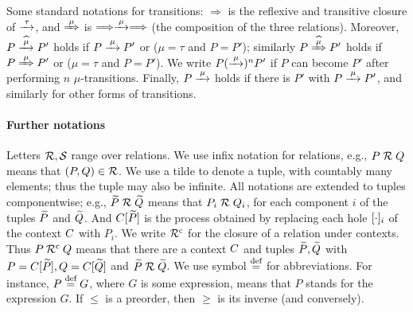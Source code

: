 Some standard notations for transitions:  $\Longrightarrow $ is the 
reflexive and  transitive closure of $\arr\tau $, and 
$\Arr \mu $ is $\Longrightarrow \arr\mu \Longrightarrow $ (the
composition of the three relations).
Moreover,   
$ 
P \arcap \mu P'$ holds if $P \arr\mu P'$ or ($\mu =\tau$ and
$P=P'$); similarly 
$ 
P \Arcap \mu P'$ holds if $P \Arr\mu P'$ or ($\mu =\tau$ and
$P=P'$).
We write $P (\arr\mu)^n P'$ if $P$ can become $P'$ after performing
$n$ $\mu$-transitions. Finally, $P \arr\mu$ holds if there is $P'$
with $P \arr\mu P'$, and similarly for other forms of transitions.




\paragraph{Further notations}
Letters  ${\cal R},{\cal S}$ range over relations.
We use infix notation for relations, e.g., 
$P \mathrel{\cal R} Q$ means that $(P,Q) \in {\cal R}$.
We use a tilde to denote a tuple, with countably many elements; thus
the tuple may also be infinite.
 All
notations  are  extended to tuples componentwise;
e.g., $\widetilde P \mathrel{\cal R} \widetilde Q$ means that $P_i \mathrel{\cal R} Q_i$, for  each  
component $i$  of the tuples $\widetilde P$ and $\widetilde Q$.
And $C [\widetilde P]$ is the process obtained by replacing each hole
$[\cdot]_{i}$ of the  context $C$ with $P_i$.  
We write $
{\cal R}^{\rm{c}}$ for the closure of a relation under contexts. Thus $P\: {\cal R}^{\rm{c}}\: Q$
means that there are a context $C$ and tuples $\widetilde P,\widetilde Q$ with
$P =  C [\widetilde P], Q =  C [\widetilde Q]$ and    $\widetilde P \mathrel{\cal R} \widetilde Q$.
We use  symbol 
$\stackrel{\mbox{\scriptsize def}}{=}$ for abbreviations. For instance, $P \stackrel{\mbox{\scriptsize def}}{=} G $, where
$G$ is some expression, means that  $P$ stands
for the  expression
$G$.
If $\leq$ is a preorder, then  $\geq$  is its inverse (and
conversely).    